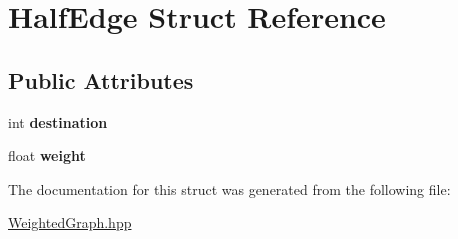 \hypertarget{struct_half_edge}{\section{Half\-Edge Struct Reference}
\label{struct_half_edge}
}
\subsection*{Public Attributes}
\begin{DoxyCompactItemize}
\item 
\hypertarget{struct_half_edge_a582f6cc4bcab4dadc27f5b786be5b50b}{int {\bfseries destination}}\label{struct_half_edge_a582f6cc4bcab4dadc27f5b786be5b50b}

\item 
\hypertarget{struct_half_edge_a095238dc3d517ce28e72480267c25086}{float {\bfseries weight}}\label{struct_half_edge_a095238dc3d517ce28e72480267c25086}

\end{DoxyCompactItemize}


The documentation for this struct was generated from the following file\-:\begin{DoxyCompactItemize}
\item 
\hyperlink{_weighted_graph_8hpp}{Weighted\-Graph.\-hpp}\end{DoxyCompactItemize}
